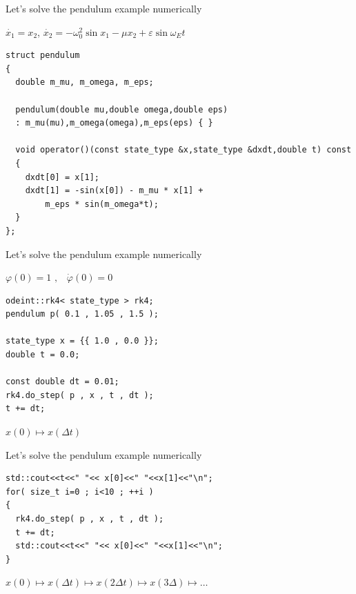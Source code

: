 \begin{frame}[fragile]

\centerline{ \Large Let's solve the pendulum example numerically}

\vspace{2ex}

$\dot{x_1} = x_2$, $\dot{x_2} = - \omega_0^2 \sin x_1 - \mu x_2 + \varepsilon \sin \omega_E t$

\vspace{2ex}

\begin{lstlisting}
struct pendulum
{
  double m_mu, m_omega, m_eps;

  pendulum(double mu,double omega,double eps)
  : m_mu(mu),m_omega(omega),m_eps(eps) { }

  void operator()(const state_type &x,state_type &dxdt,double t) const
  {
    dxdt[0] = x[1];
    dxdt[1] = -sin(x[0]) - m_mu * x[1] +
        m_eps * sin(m_omega*t);
  }
};
\end{lstlisting}

\end{frame}

\begin{frame}[fragile]
 \centerline{ \Large Let's solve the pendulum example numerically}

\vspace{2ex}
$\varphi(0) = 1 \,\, \text{,} \quad \dot{\varphi}(0) = 0$
\vspace{2ex}

\begin{lstlisting}
odeint::rk4< state_type > rk4;
pendulum p( 0.1 , 1.05 , 1.5 );

state_type x = {{ 1.0 , 0.0 }};
double t = 0.0;

const double dt = 0.01;
rk4.do_step( p , x , t , dt );
t += dt;
\end{lstlisting}

\vspace{2ex}

$x(0) \mapsto x(\Delta t)$

\end{frame}

\begin{frame}[fragile]
 \centerline{ \Large Let's solve the pendulum example numerically}

\vspace{2ex}


\begin{lstlisting}
std::cout<<t<<" "<< x[0]<<" "<<x[1]<<"\n";
for( size_t i=0 ; i<10 ; ++i )
{
  rk4.do_step( p , x , t , dt );
  t += dt;
  std::cout<<t<<" "<< x[0]<<" "<<x[1]<<"\n";
}
\end{lstlisting}

\vspace{2ex}

$x(0) \mapsto x(\Delta t) \mapsto x(2\Delta t) \mapsto x(3\Delta) \mapsto \dots$

\end{frame}


